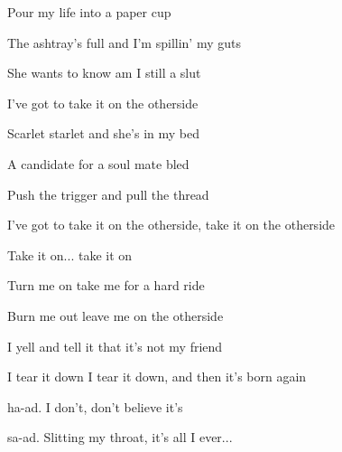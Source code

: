 \begin{song}
\bigskip

 Pour my life into a paper cup \par
{} The ashtray's full and I'm spillin' my guts \par
{} She wants to know am I still a slut \par
I've got to take it on the otherside 

\bigskip

 Scarlet starlet and she's in my bed \par
{} A candidate for a soul mate bled \par
{} Push the trigger and pull the thread \par
I've got to take it on the otherside, take it on the otherside \par
{}Take it on... take it on

\bigskip

\Chorus

\bigskip

   \par
{}   \par

\bigskip

 Turn me on take me for a hard ride \par
{} Burn me out leave me on the otherside \par
{} I yell and tell it that it's not my friend \par
I tear it down I tear it down, and then it's born again 

\bigskip

    \par

\bigskip

\Chorus

\bigskip

ha-ad. I don't, don't believe it's \par
{}sa-ad. Slitting my throat, it's all I ever...  \par

\end{song}
